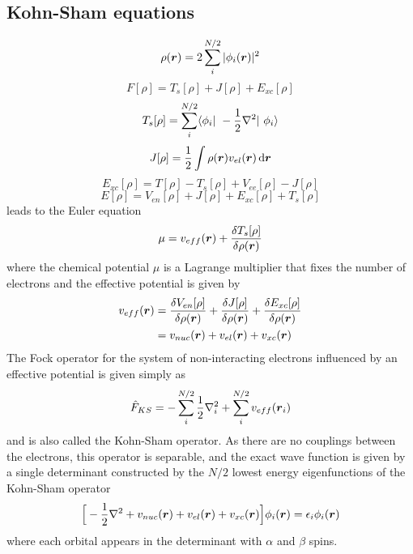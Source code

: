 \subsection{Kohn-Sham equations}
\begin{equation}
    \rho(\boldsymbol r) = 2 \sum_i^{N/2} | \phi_i(\boldsymbol r)|^2
\end{equation}
\begin{equation}
    F[\rho] = T_s[\rho] + J[\rho] + E_{xc}[\rho]
\end{equation}
\begin{equation}
    T_s[\rho] = \sum_i^{N/2} \langle \orbital_i | -\frac{1}{2}\nabla^2 | \orbital_i \rangle
\end{equation}
\begin{equation}
    J[\rho] = \frac{1}{2} \int \rho(\boldsymbol r)v_{el}(\boldsymbol r) \,\mathrm{d} \boldsymbol r
\end{equation}
\begin{equation}
    E_{xc}[\rho] = T[\rho] - T_s[\rho] + V_{ee}[\rho] - J[\rho]
\end{equation}
\begin{equation}
    E[\rho] = V_{en}[\rho] + J[\rho] + E_{xc}[\rho] + T_s[\rho]
\end{equation}
leads to the Euler equation
\begin{equation}
    \mu = v_{eff}(\boldsymbol r) + \frac{\delta T_s[\rho]}{\delta \rho(\boldsymbol r)}
\end{equation}
where the chemical potential $\mu$ is a Lagrange multiplier that fixes the number of 
electrons and the effective potential is given by
\begin{align}
    v_{eff}(\boldsymbol r) 
	&= \frac{\delta V_{en}[\rho]}{\delta \rho(\boldsymbol r)}
	+ \frac{\delta J[\rho]}{\delta \rho(\boldsymbol r)}
	+ \frac{\delta E_{xc}[\rho]}{\delta \rho(\boldsymbol r)}\\
	&= v_{nuc}(\boldsymbol r) + v_{el}(\boldsymbol r) + v_{xc}(\boldsymbol r)
\end{align}
The Fock operator for the system of non-interacting electrons influenced by an effective
potential is given simply as
\begin{equation}
    \hat{F}_{KS} = -\sum_i^{N/2} \frac{1}{2}\nabla_i^2 + \sum_i^{N/2} v_{eff}(\boldsymbol r_i)
\end{equation}
and is also called the Kohn-Sham operator. As there are no couplings between the electrons, 
this operator is separable, and the exact wave function is given by a single determinant 
constructed by the $N/2$ lowest energy eigenfunctions of the Kohn-Sham operator
\begin{equation}
    \Big[-\frac{1}{2}\nabla^2 + v_{nuc}(\boldsymbol r) + v_{el}(\boldsymbol r) + v_{xc}(\boldsymbol r)\Big] 
	\phi_i(\boldsymbol r) = \epsilon_i \phi_i(\boldsymbol r)
\end{equation}
where each orbital appears in the determinant with $\alpha$ and $\beta$ spins.

